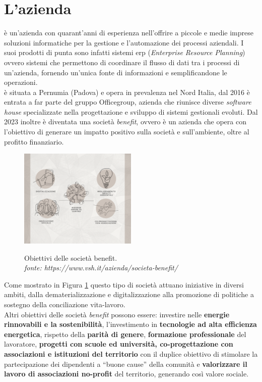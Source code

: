 \section{L'azienda}
{\company} è un'azienda con quarant'anni di esperienza nell'offrire a piccole e medie imprese soluzioni informatiche per la 
gestione e l'automazione dei processi aziendali. I suoi prodotti di punta sono infatti sistemi \gls{erp} (\textit{Enterprise 
Resource Planning}) ovvero sistemi che permettono di coordinare il flusso di dati tra i processi di un'azienda, fornendo un'unica fonte di 
informazioni e semplificandone le operazioni.\\
{\company} è situata a Pernumia (Padova) e opera in prevalenza nel Nord Italia, dal 2016 è entrata a far parte del gruppo Officegroup, azienda 
che riunisce diverse \textit{software house} specializzate nella progettazione e sviluppo di sistemi gestionali evoluti. 
Dal 2023 inoltre è diventata una società \textit{benefit}, ovvero è un azienda che opera con l'obiettivo di generare un impatto positivo 
sulla società e sull'ambiente, oltre al profitto finanziario.

\begin{figure}[H]
    \centering
    \includegraphics[alt={Obiettivi delle società benefit}, width=0.5\textwidth]{img/soc-benefit.png}
    \caption[Obiettivi delle società benefit.]{Obiettivi delle società benefit. \\ \textit{fonte: https://www.vsh.it/azienda/societa-benefit/}}
    \label{fig:società benefit}
\end{figure}

Come mostrato in Figura \ref{fig:società benefit} questo tipo di società attuano iniziative in diversi ambiti, dalla dematerializzazione 
e digitalizzazione alla promozione di politiche a sostegno della conciliazione vita-lavoro.\\
Altri obiettivi delle società \textit{benefit} possono essere: investire nelle \textbf{energie rinnovabili e la sostenibilità}, l'investimento in \textbf{tecnologie 
ad alta efficienza energetica}, rispetto della \textbf{parità di genere}, \textbf{formazione professionale} del lavoratore, \textbf{progetti con scuole ed 
università, co-progettazione con associazioni e istituzioni del territorio} con il duplice obiettivo di stimolare la partecipazione dei dipendenti 
a “buone cause” della comunità e \textbf{valorizzare il lavoro di associazioni no-profit} del territorio, generando così valore sociale.

